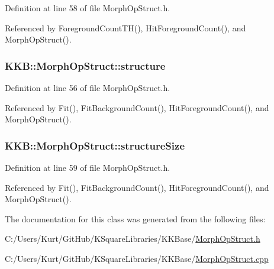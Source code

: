 Definition at line 58 of file Morph\+Op\+Struct.\+h.



Referenced by Foreground\+Count\+T\+H(), Hit\+Foreground\+Count(), and Morph\+Op\+Struct().

\subsubsection[{\texorpdfstring{structure}{structure}}]{ K\+K\+B\+::\+Morph\+Op\+Struct\+::structure\hspace{0.3cm}{\ttfamily [protected]}}\hypertarget{class_k_k_b_1_1_morph_op_struct_ad179451936cbbe609f930605eda869bc}{}\label{class_k_k_b_1_1_morph_op_struct_ad179451936cbbe609f930605eda869bc}


Definition at line 56 of file Morph\+Op\+Struct.\+h.



Referenced by Fit(), Fit\+Background\+Count(), Hit\+Foreground\+Count(), and Morph\+Op\+Struct().

\subsubsection[{\texorpdfstring{structure\+Size}{structureSize}}]{ K\+K\+B\+::\+Morph\+Op\+Struct\+::structure\+Size\hspace{0.3cm}{\ttfamily [protected]}}\hypertarget{class_k_k_b_1_1_morph_op_struct_a3aeaf4c1bde185cc080f684ee74c237b}{}\label{class_k_k_b_1_1_morph_op_struct_a3aeaf4c1bde185cc080f684ee74c237b}


Definition at line 59 of file Morph\+Op\+Struct.\+h.



Referenced by Fit(), Fit\+Background\+Count(), Hit\+Foreground\+Count(), and Morph\+Op\+Struct().



The documentation for this class was generated from the following files\+:\begin{DoxyCompactItemize}
\item 
C\+:/\+Users/\+Kurt/\+Git\+Hub/\+K\+Square\+Libraries/\+K\+K\+Base/\hyperlink{_morph_op_struct_8h}{Morph\+Op\+Struct.\+h}\item 
C\+:/\+Users/\+Kurt/\+Git\+Hub/\+K\+Square\+Libraries/\+K\+K\+Base/\hyperlink{_morph_op_struct_8cpp}{Morph\+Op\+Struct.\+cpp}\end{DoxyCompactItemize}
